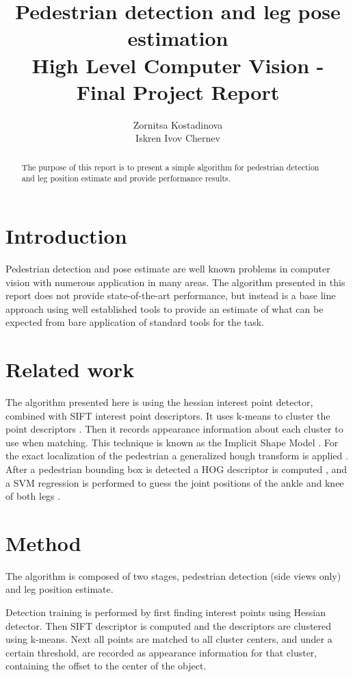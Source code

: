 \documentclass[a4paper]{article}
\begin{document}
\title{Pedestrian detection and leg pose estimation \\
       High Level Computer Vision - Final Project Report}
\author{Zornitsa Kostadinova \\ Iskren Ivov Chernev}
\maketitle

\begin{abstract}
The purpose of this report is to present a simple algorithm for pedestrian
detection and leg position estimate and provide performance results.
\end{abstract}
\newpage

\section{Introduction}
Pedestrian detection and pose estimate are well known problems in computer
vision with numerous application in many areas. The algorithm presented in this
report does not provide state-of-the-art performance, but instead is a base
line approach using well established tools to provide an estimate of what can
be expected from bare application of standard tools for the task.

\section{Related work}
The algorithm presented here is using the hessian \cite{hessian} interest point
detector, combined with SIFT \cite{sift} \cite{sift2} interest point
descriptors. It uses k-means to cluster the point descriptors \cite{kmeans}.
Then it records appearance information about each cluster to use when matching.
This technique is known as the Implicit Shape Model \cite{ism}. For the exact
localization of the pedestrian a generalized hough transform is applied
\cite{hough}. After a pedestrian bounding box is detected a HOG descriptor is
computed \cite{hog1}, and a SVM regression is performed to guess the joint
positions of the ankle and knee of both legs \cite{svm1}.

\section{Method}
The algorithm is composed of two stages, pedestrian detection (side views only)
and leg position estimate.

Detection training is performed by first finding interest points using Hessian
detector.  Then SIFT descriptor is computed and the descriptors are clustered
using k-means. Next all points are matched to all cluster centers, and under
a certain threshold, are recorded as appearance information for that cluster,
containing the offset to the center of the object.
\end{document}
